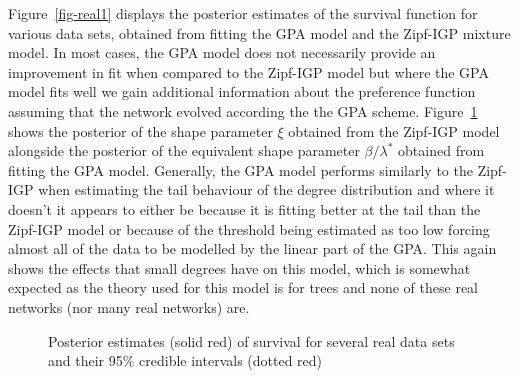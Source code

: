 \documentclass[
  sn-basic,
]{sn-jnl}
\theoremstyle{plain}
\theoremstyle{remark}
\begin{document}
Figure~\ref{fig-real1} displays the posterior estimates of the survival
function for various data sets, obtained from fitting the GPA model and
the Zipf-IGP mixture model. In most cases, the GPA model does not
necessarily provide an improvement in fit when compared to the Zipf-IGP
model but where the GPA model fits well we gain additional information
about the preference function assuming that the network evolved
according the the GPA scheme. Figure~\ref{fig-shapes} shows the
posterior of the shape parameter \(\xi\) obtained from the Zipf-IGP
model alongside the posterior of the equivalent shape parameter
\(\beta/\lambda^*\) obtained from fitting the GPA model. Generally, the
GPA model performs similarly to the Zipf-IGP when estimating the tail
behaviour of the degree distribution and where it doesn't it appears to
either be because it is fitting better at the tail than the Zipf-IGP
model or because of the threshold being estimated as too low forcing
almost all of the data to be modelled by the linear part of the GPA.
This again shows the effects that small degrees have on this model,
which is somewhat expected as the theory used for this model is for
trees and none of these real networks (nor many real networks) are.

\begin{figure}[H]


\caption{\label{fig-shapes}Posterior estimates (solid red) of survival
for several real data sets and their 95\% credible intervals (dotted
red)}

\end{figure}%
\end{document}
